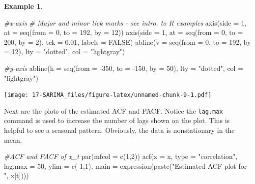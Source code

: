 \documentclass[
]{book}
\newenvironment{Shaded}{\begin{snugshade}}{\end{snugshade}}
\newcommand{\AttributeTok}[1]{\textcolor[rgb]{0.77,0.63,0.00}{#1}}
\newcommand{\CommentTok}[1]{\textcolor[rgb]{0.56,0.35,0.01}{\textit{#1}}}
\newcommand{\ConstantTok}[1]{\textcolor[rgb]{0.00,0.00,0.00}{#1}}
\newcommand{\DecValTok}[1]{\textcolor[rgb]{0.00,0.00,0.81}{#1}}
\newcommand{\FloatTok}[1]{\textcolor[rgb]{0.00,0.00,0.81}{#1}}
\newcommand{\FunctionTok}[1]{\textcolor[rgb]{0.00,0.00,0.00}{#1}}
\newcommand{\NormalTok}[1]{#1}
\newcommand{\SpecialCharTok}[1]{\textcolor[rgb]{0.00,0.00,0.00}{#1}}
\newcommand{\StringTok}[1]{\textcolor[rgb]{0.31,0.60,0.02}{#1}}
\theoremstyle{definition}
\theoremstyle{definition}
\newtheorem{example}{Example}[chapter]
\theoremstyle{definition}
\theoremstyle{definition}
\theoremstyle{remark}
\begin{document}
\begin{example}
\begin{Shaded}
\begin{Highlighting}[]
\CommentTok{\#x{-}axis }
\CommentTok{\# Major and minor tick marks {-} see intro. to R examples}
\FunctionTok{axis}\NormalTok{(}\AttributeTok{side =} \DecValTok{1}\NormalTok{, }\AttributeTok{at =} \FunctionTok{seq}\NormalTok{(}\AttributeTok{from =} \DecValTok{0}\NormalTok{, }\AttributeTok{to =} \DecValTok{192}\NormalTok{, }\AttributeTok{by =} \DecValTok{12}\NormalTok{)) }
\FunctionTok{axis}\NormalTok{(}\AttributeTok{side =} \DecValTok{1}\NormalTok{, }\AttributeTok{at =} \FunctionTok{seq}\NormalTok{(}\AttributeTok{from =} \DecValTok{0}\NormalTok{, }\AttributeTok{to =} \DecValTok{200}\NormalTok{, }\AttributeTok{by =} \DecValTok{2}\NormalTok{), }
    \AttributeTok{tck =} \FloatTok{0.01}\NormalTok{, }\AttributeTok{labels =} \ConstantTok{FALSE}\NormalTok{) }
\FunctionTok{abline}\NormalTok{(}\AttributeTok{v =} \FunctionTok{seq}\NormalTok{(}\AttributeTok{from =} \DecValTok{0}\NormalTok{, }\AttributeTok{to =} \DecValTok{192}\NormalTok{, }\AttributeTok{by =} \DecValTok{12}\NormalTok{), }\AttributeTok{lty =} 
      \StringTok{"dotted"}\NormalTok{, }\AttributeTok{col =} \StringTok{"lightgray"}\NormalTok{)}

\CommentTok{\#y{-}axis }
\FunctionTok{abline}\NormalTok{(}\AttributeTok{h =} \FunctionTok{seq}\NormalTok{(}\AttributeTok{from =} \SpecialCharTok{{-}}\DecValTok{350}\NormalTok{, }\AttributeTok{to =} \SpecialCharTok{{-}}\DecValTok{150}\NormalTok{, }\AttributeTok{by =} \DecValTok{50}\NormalTok{), }\AttributeTok{lty =} 
    \StringTok{"dotted"}\NormalTok{, }\AttributeTok{col =} \StringTok{"lightgray"}\NormalTok{)}
\end{Highlighting}
\end{Shaded}

\texttt{[image: 17-SARIMA\_files/figure-latex/unnamed-chunk-9-1.pdf]}

Next are the plots of the estimated ACF and PACF. Notice the \texttt{lag.max} command is used to increase the number of lags shown on the plot. This is helpful to see a seasonal pattern. Obviously, the data is nonstationary in the mean.

\begin{Shaded}
\begin{Highlighting}[]
\CommentTok{\#ACF and PACF of x\_t}
\FunctionTok{par}\NormalTok{(}\AttributeTok{mfcol =} \FunctionTok{c}\NormalTok{(}\DecValTok{1}\NormalTok{,}\DecValTok{2}\NormalTok{))}
\FunctionTok{acf}\NormalTok{(}\AttributeTok{x =}\NormalTok{ x, }\AttributeTok{type =} \StringTok{"correlation"}\NormalTok{, }\AttributeTok{lag.max =} \DecValTok{50}\NormalTok{, }\AttributeTok{ylim =} 
    \FunctionTok{c}\NormalTok{(}\SpecialCharTok{{-}}\DecValTok{1}\NormalTok{,}\DecValTok{1}\NormalTok{), }\AttributeTok{main =} \FunctionTok{expression}\NormalTok{(}\FunctionTok{paste}\NormalTok{(}\StringTok{"Estimated ACF plot }
\StringTok{    for "}\NormalTok{, x[t])))}
\end{Highlighting}
\end{Shaded}


\end{example}
\end{document}
